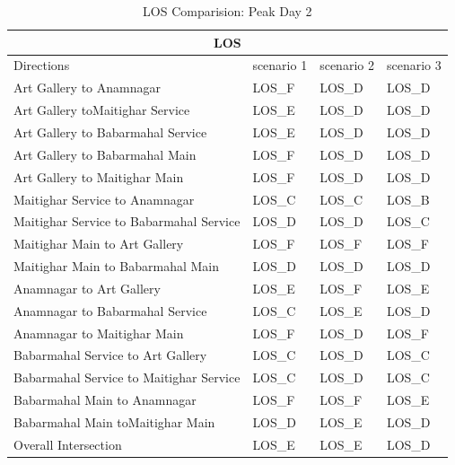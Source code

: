  \begin{table}
    \centering
    \caption{LOS Comparision: Peak Day 2}
    \begin{tabular}{|l|l|l|l|}
        \hline
        \multicolumn{4}{|c|}{\textbf{LOS}} \\
        \hline
        Directions &	scenario 1 &	scenario 2 &	scenario 3 \\
        \hline
        Art Gallery to  Anamnagar	&LOS\_F	&LOS\_D	& LOS\_D \\
        \hline
        Art Gallery toMaitighar Service	&LOS\_E	&LOS\_D	& LOS\_D \\
        \hline
        Art Gallery to Babarmahal Service	&LOS\_E	&LOS\_D	& LOS\_D \\
        \hline
        Art Gallery to Babarmahal Main	&LOS\_F	&LOS\_D	& LOS\_D \\
        \hline
        Art Gallery to  Maitighar Main	&LOS\_F	&LOS\_D	& LOS\_D \\
        \hline
        Maitighar Service to  Anamnagar	&LOS\_C	&LOS\_C	& LOS\_B \\
        \hline
        Maitighar Service to Babarmahal Service	&LOS\_D	&LOS\_D	& LOS\_C \\
        \hline
        Maitighar Main to  Art Gallery	&LOS\_F	&LOS\_F	& LOS\_F \\
        \hline
        Maitighar Main to Babarmahal Main	&LOS\_D	&LOS\_D	& LOS\_D \\
        \hline
        Anamnagar to Art Gallery	&LOS\_E	&LOS\_F	& LOS\_E \\
        \hline
        Anamnagar to  Babarmahal Service	&LOS\_C	&LOS\_E	& LOS\_D \\
        \hline
        Anamnagar to Maitighar Main	&LOS\_F	&LOS\_D	& LOS\_F \\
        \hline
        Babarmahal Service to  Art Gallery	&LOS\_C	&LOS\_D	& LOS\_C \\
        \hline
        Babarmahal Service  to Maitighar Service	&LOS\_C	&LOS\_D	& LOS\_C \\
        \hline
        Babarmahal Main to  Anamnagar	&LOS\_F	&LOS\_F	& LOS\_E \\
        \hline
        Babarmahal Main toMaitighar Main	&LOS\_D	&LOS\_E	& LOS\_D \\
        \hline
        Overall Intersection	&LOS\_E	&LOS\_E	& LOS\_D \\
        \hline
        
    \end{tabular}
 \end{table}

